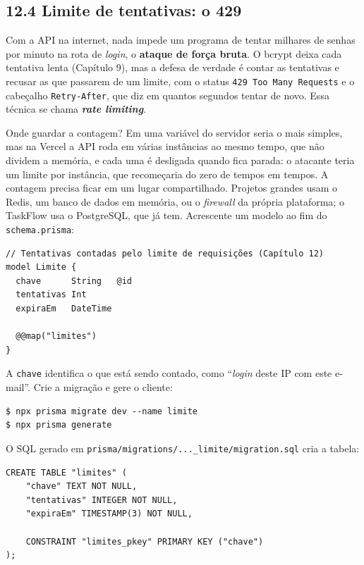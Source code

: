 \subsection{12.4 Limite de tentativas: o 429}

Com a API na internet, nada impede um programa de tentar milhares de senhas por minuto na rota de \textit{login}, o \textbf{ataque de força bruta}. O bcrypt deixa cada tentativa lenta (Capítulo 9), mas a defesa de verdade é contar as tentativas e recusar as que passarem de um limite, com o status \texttt{429 Too Many Requests} e o cabeçalho \texttt{Retry-After}, que diz em quantos segundos tentar de novo. Essa técnica se chama \textbf{\textit{rate limiting}}.

Onde guardar a contagem? Em uma variável do servidor seria o mais simples, mas na Vercel a API roda em várias instâncias ao mesmo tempo, que não dividem a memória, e cada uma é desligada quando fica parada: o atacante teria um limite por instância, que recomeçaria do zero de tempos em tempos. A contagem precisa ficar em um lugar compartilhado. Projetos grandes usam o Redis, um banco de dados em memória, ou o \textit{firewall} da própria plataforma; o TaskFlow usa o PostgreSQL, que já tem. Acrescente um modelo ao fim do \texttt{schema.prisma}:

\begin{codigo}
\begin{Verbatim}[breaklines=true, breaksymbolleft={}, fontsize=\footnotesize]
// Tentativas contadas pelo limite de requisições (Capítulo 12)
model Limite {
  chave      String   @id
  tentativas Int
  expiraEm   DateTime

  @@map("limites")
}
\end{Verbatim}
\end{codigo}

A \texttt{chave} identifica o que está sendo contado, como ``\textit{login} deste IP com este e-mail''. Crie a migração e gere o cliente:

\begin{codigo}
\begin{Verbatim}[breaklines=true, breaksymbolleft={}, fontsize=\footnotesize]
$ npx prisma migrate dev --name limite
$ npx prisma generate
\end{Verbatim}
\end{codigo}

O SQL gerado em \texttt{prisma/migrations/...\_limite/migration.sql} cria a tabela:

\begin{codigo}
\begin{Verbatim}[breaklines=true, breaksymbolleft={}, fontsize=\footnotesize]
CREATE TABLE "limites" (
    "chave" TEXT NOT NULL,
    "tentativas" INTEGER NOT NULL,
    "expiraEm" TIMESTAMP(3) NOT NULL,

    CONSTRAINT "limites_pkey" PRIMARY KEY ("chave")
);
\end{Verbatim}
\end{codigo}


